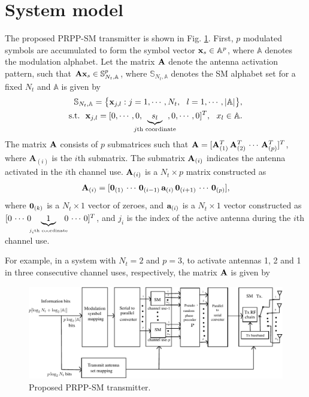 \documentclass[11pt, onecolumn]{report}
\newcommand{\vx}{{\bf x}}
\newcommand{\ma}{{\bf A}}
\newcommand{\sm}{{\mathbb S}_{N_t,{\mathbb A}}}
\newcommand{\sa}{{\mathbb A}}
\begin{document}
\section{System model}
The proposed PRPP-SM transmitter is shown in Fig. \ref{smprecod}.
First, $p$ modulated symbols are 
accumulated  to form the symbol vector $\vx_s \in \sa^p$, where $\mathbb A$ denotes the modulation alphabet. Let the matrix $\ma$ denote the antenna activation pattern, 
such that $\ma\vx_s \in \sm^p$, where $\sm$ denotes the SM alphabet set for a fixed $N_t$ and $\mathbb A$ is given by \begin{eqnarray}
\sm = 
\big \{ {\bf x}_{j,l}:j=1,\cdots,N_t, \ \ l=1,\cdots,|{\mathbb A}| \big \}, \nonumber \\ 
\mbox{s.t.} \ \ {\bf x}_{j,l} = 
[0,\cdots,0,\hspace{-4mm}\underbrace{s_{l}}_{{\scriptsize{\mbox{$j$th coordinate}}}}\hspace{-3.5mm},0,\cdots,0]^T, \ \ x_l \in \mathbb{A}.  
\end{eqnarray} The matrix $\ma$ consists of $p$ 
submatrices such that $\ma=[\ma_{(1)}^T \, \ma_{(2)}^T \, \cdots \, \ma_{(p)}^T]^T$, where $\mathbf A_{(i)}$ is the $i$th submatrix. The submatrix $\ma_{(i)}$ indicates the antenna activated in the
$i$th channel use. $\ma_{(i)}$ is a $N_t\times p$ matrix constructed as 
\begin{eqnarray}
\ma_{(i)}=[{\bf 0}_{(1)} \, \cdots \, {\bf 0}_{(i-1)} \, {\bf a}_{(i)} \, {\bf 0}_{(i+1)} \, \cdots \, {\bf 0}_{(p)}],
\end{eqnarray} 
where ${\bf 0}_{(k)}$ is a $N_t\times 1$ vector of zeroes, and 
${\bf a}_{(i)}$ is a $N_t\times 1$ vector constructed as
$[0 \, \cdots \, 0 \, \hspace{-2mm}\underbrace{1}_{\mbox{\tiny{$j_i$th coordinate}}} \hspace{-2mm} 0 \, \cdots \, 0]^T$, and $j_i$ is the index of the active antenna
during the $i$th channel use.

For example, in a system with $N_t=2$ and $p=3$, to activate antennas
1, 2 and 1 in three consecutive channel uses, respectively, the matrix 
$\ma$ is given by

\begin{figure}[t]
\centering

\includegraphics[scale=0.8]{rppsm.pdf}
\caption{Proposed PRPP-SM transmitter.}
\label{smprecod}
\end{figure}
\end{document}
